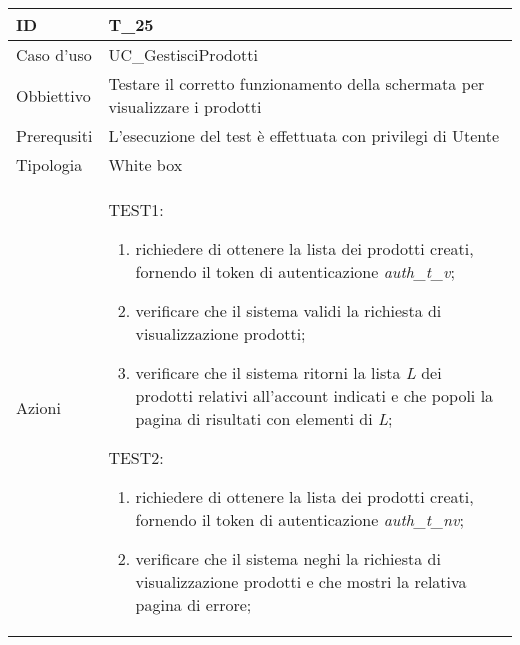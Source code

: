 \begin{table}[hb]
    \centering
    \begin{tabular}{ |p{2cm}|p{10cm}|  }
        \hline
        ID          & T\_25                                                                      \\\hline
        Caso d'uso  & UC\_GestisciProdotti                                                      \\\hline
        Obbiettivo  & Testare il corretto funzionamento della schermata per visualizzare i prodotti  \\\hline
        Prerequsiti & L'esecuzione del test è effettuata con privilegi di Utente                 \\\hline
        Tipologia   & White box                                                                  \\\hline
        Azioni      &
        TEST1:
        \begin{enumerate}[nosep, topsep=0pt]
            \item richiedere di ottenere la lista dei prodotti creati, fornendo il token di autenticazione \emph{auth\_t\_v};
            \item verificare che il sistema validi la richiesta di visualizzazione prodotti;
            \item verificare che il sistema ritorni la lista \emph{L} dei prodotti relativi all'account indicati e che popoli la pagina di risultati con elementi di \emph{L};
        \end{enumerate}
        \vspace{0.5cm} TEST2:
        \begin{enumerate}[nosep, topsep=0pt]
            \item richiedere di ottenere la lista dei prodotti creati, fornendo il token di autenticazione \emph{auth\_t\_nv};
            \item verificare che il sistema neghi la richiesta di visualizzazione prodotti e che mostri la relativa pagina di errore;
        \end{enumerate}
        \\\hline
    \end{tabular}
\end{table}


